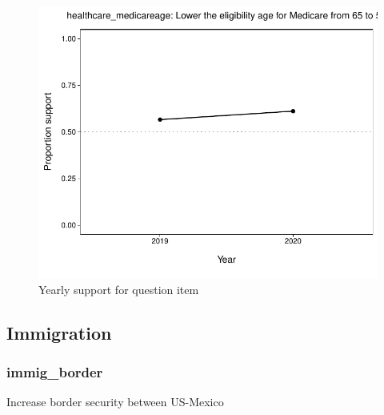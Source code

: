 \documentclass[
  12pt]{article}
\begin{document}
\begin{figure}

{\centering \includegraphics{error-checking_files/figure-latex/unnamed-chunk-3-19} 

}

\caption{Yearly support for question item}\label{fig:unnamed-chunk-3-19}
\end{figure}

\newpage

\hypertarget{immigration}{%
\subsection{Immigration}\label{immigration}}

\hypertarget{immig_border}{%
\subsubsection{immig\_border}\label{immig_border}}

Increase border security between US-Mexico
\end{document}
